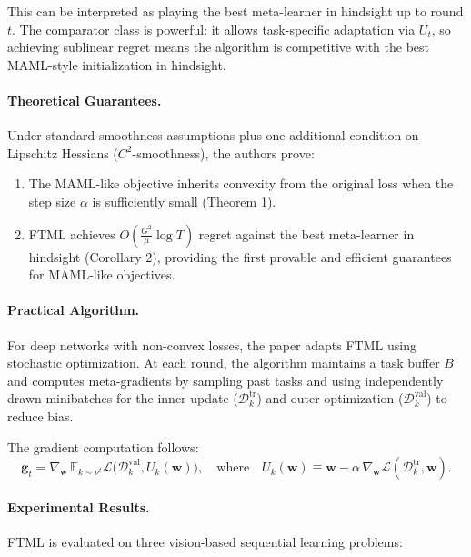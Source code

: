 \documentclass[12pt]{article}
\begin{document}
This can be interpreted as playing the best meta-learner in hindsight up to
round $t$. The comparator class is powerful: it allows task-specific adaptation
via $U_t$, so achieving sublinear regret means the algorithm is competitive with
the best MAML-style initialization in hindsight.

\paragraph{Theoretical Guarantees.}
Under standard smoothness assumptions plus one additional condition on Lipschitz
Hessians ($C^2$-smoothness), the authors prove:

\begin{enumerate}
		\item The MAML-like objective inherits convexity from the original loss
				when the step size $\alpha$ is sufficiently small (Theorem 1).
		\item FTML achieves $O\!\left(\frac{G^2}{\mu}\log T\right)$ regret against
				the best meta-learner in hindsight (Corollary 2), providing the first
				provable and efficient guarantees for MAML-like objectives.
\end{enumerate}

\paragraph{Practical Algorithm.}
For deep networks with non-convex losses, the paper adapts FTML using stochastic
optimization. At each round, the algorithm maintains a task buffer $B$ and
computes meta-gradients by sampling past tasks and using independently drawn
minibatches for the inner update ($\mathcal{D}^{\text{tr}}_k$) and outer
optimization ($\mathcal{D}^{\text{val}}_k$) to reduce bias.

The gradient computation follows:
\[
		\mathbf{g}_t = \nabla_{\mathbf{w}} \, \mathbb{E}_{k \sim \nu^t}
		\mathcal{L}\bigl(\mathcal{D}_k^{\text{val}}, U_k(\mathbf{w})\bigr),
		\quad \text{where} \quad
		U_k(\mathbf{w}) \equiv \mathbf{w} - \alpha \, \nabla_{\mathbf{w}}
		\mathcal{L}(\mathcal{D}_k^{\text{tr}}, \mathbf{w}).
\]

\paragraph{Experimental Results.}
FTML is evaluated on three vision-based sequential learning problems:
\end{document}
